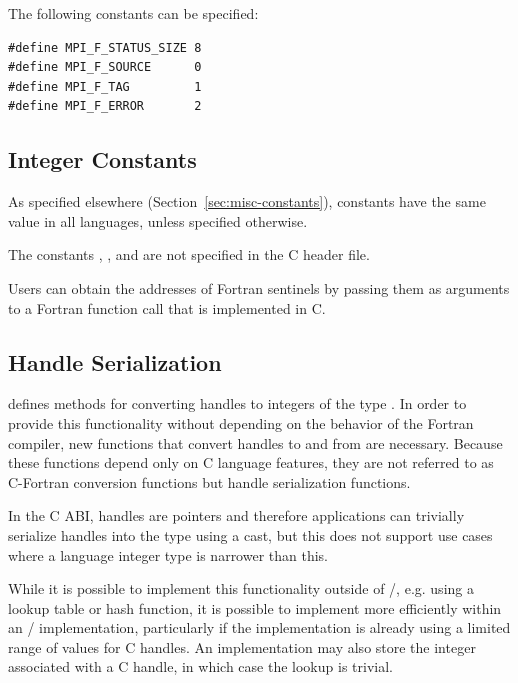 The following constants can be specified:
\begin{lstlisting}[language={[MPI]C}]
#define MPI_F_STATUS_SIZE 8
#define MPI_F_SOURCE      0
#define MPI_F_TAG         1
#define MPI_F_ERROR       2
\end{lstlisting}

\subsection{Integer Constants}

As specified elsewhere (Section~\ref{sec:misc-constants}),
constants have the same value in all languages, unless specified otherwise.

\begin{sloppy}
The constants
, ,
 and 
are not specified in the C header file.

\end{sloppy}

\begin{rationale}
Users can obtain the addresses of Fortran sentinels by passing them as
arguments to a Fortran function call that is implemented in C.
\end{rationale}

\subsection{Handle Serialization}
\label{sec:abi-handleserialization}

 defines
methods for converting handles to integers of the type
.
In order to provide this functionality without depending
on the behavior of the Fortran compiler,
new functions that convert handles to and from
 are necessary.
Because these functions depend only on C language features,
they are not referred to as C-Fortran conversion functions
but handle serialization functions.

In the C ABI, handles are pointers and therefore applications
can trivially serialize handles into the type 
using a cast, but this does not support use cases where a
language integer type is narrower than this.

\begin{rationale}
While it is possible to implement this functionality outside of \MPI/,
e.g. using a lookup table or hash function,
it is possible to implement more efficiently within an \MPI/
implementation, particularly if the implementation is already
using a limited range of values for C handles.
An implementation may also store the integer associated with
a C handle, in which case the lookup is trivial.
\end{rationale}

